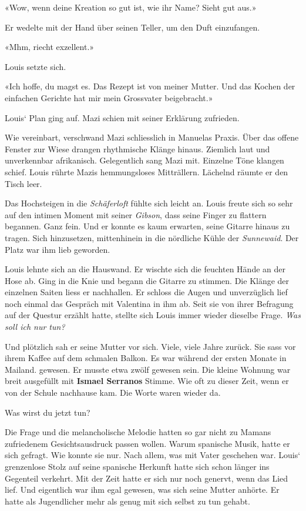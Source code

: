 «Wow, wenn deine Kreation so gut ist, wie ihr Name? Sieht gut aus.»

Er wedelte mit der Hand über seinen Teller, um den Duft einzufangen.

«Mhm, riecht exzellent.»

Louis setzte sich.

«Ich hoffe, du magst es. Das Rezept ist von meiner Mutter. Und das
Kochen der einfachen Gerichte hat mir mein Grossvater beigebracht.»

Louis` Plan ging auf. Mazi schien mit seiner Erklärung zufrieden.

Wie vereinbart, verschwand Mazi schliesslich in Manuelas Praxis. Über
das offene Fenster zur Wiese drangen rhythmische Klänge hinaus. Ziemlich
laut und unverkennbar afrikanisch. Gelegentlich sang Mazi mit. Einzelne
Töne klangen schief. Louis rührte Mazis hemmungsloses Mitträllern.
Lächelnd räumte er den Tisch leer.

Das Hochsteigen in die \emph{Schäferloft} fühlte sich leicht an. Louis
freute sich so sehr auf den intimen Moment mit seiner \emph{Gibson},
dass seine Finger zu flattern begannen. Ganz fein. Und er konnte es kaum
erwarten, seine Gitarre hinaus zu tragen. Sich hinzusetzen, mittenhinein
in die nördliche Kühle der \emph{Sunnewaid}. Der Platz war ihm lieb
geworden.

Louis lehnte sich an die Hauswand. Er wischte sich die feuchten Hände an
der Hose ab. Ging in die Knie und begann die Gitarre zu stimmen. Die
Klänge der einzelnen Saiten liess er nachhallen. Er schloss die Augen
und unverzüglich lief noch einmal das Gespräch mit Valentina in ihm ab.
Seit sie von ihrer Befragung auf der Questur erzählt hatte, stellte sich
Louis immer wieder dieselbe Frage. \emph{Was soll ich nur tun?}

Und plötzlich sah er seine Mutter vor sich. Viele, viele Jahre zurück.
Sie sass vor ihrem Kaffee auf dem schmalen Balkon. Es war während der
ersten Monate in Mailand. gewesen. Er musste etwa zwölf gewesen sein.
Die kleine Wohnung war breit ausgefüllt mit \textbf{Ismael Serranos}
Stimme. Wie oft zu dieser Zeit, wenn er von der Schule nachhause kam.
Die Worte waren wieder da.

Was wirst du jetzt tun?

Die Frage und die melancholische Melodie hatten so gar nicht zu Mamans
zufriedenem Gesichtsausdruck passen wollen. Warum spanische Musik, hatte
er sich gefragt. Wie konnte sie nur. Nach allem, was mit Vater geschehen
war. Louis` grenzenlose Stolz auf seine spanische Herkunft hatte sich
schon länger ins Gegenteil verkehrt. Mit der Zeit hatte er sich nur noch
genervt, wenn das Lied lief. Und eigentlich war ihm egal gewesen, was
sich seine Mutter anhörte. Er hatte als Jugendlicher mehr als genug mit
sich selbst zu tun gehabt.

